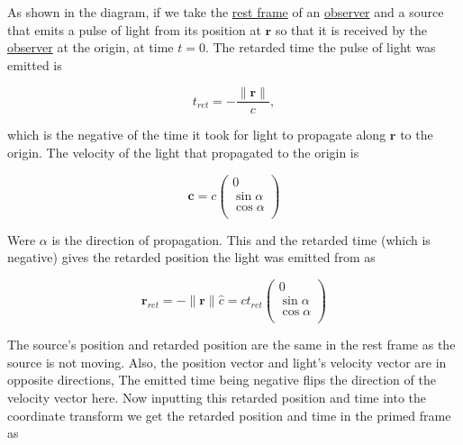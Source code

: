As shown in the diagram, if we take the \hyperlink{def-proper-frame}{rest frame} of an \hyperlink{def-observer}{observer} and a source that emits a pulse of light from its position at ${\mathbf{r}}$ so that it is received by the \hyperlink{def-observer}{observer} at the origin, at time ${t} = 0$.
The retarded time the pulse of light was emitted is

\begin{equation}
{{t}_{ret}} =-\frac{\|\mathbf{r}\|}{c},
\end{equation}

which is the negative of the time it took for light to propagate along ${\mathbf{r}}$ to the origin.
The velocity of the light that propagated to the origin is

\begin{equation}
	\mathbf{c} = {c}
	\begin{pmatrix}
		0            \\
		\sin{\alpha} \\
		\cos{\alpha} \\
	\end{pmatrix}
\end{equation}

Were ${\alpha}$ is the direction of propagation.
This and the retarded time (which is negative) gives the retarded position the light was emitted from as

\begin{equation}
	\mathbf{r}_{ret} = -\|\mathbf{r}\|\hat{c} ={c}{{{t}_{ret}}}
	\begin{pmatrix}
		0            \\
		\sin{\alpha} \\
		\cos{\alpha} \\
	\end{pmatrix}
\end{equation}

The source's position and retarded position are the same in the rest frame as the source is not moving.
Also, the position vector and light's velocity vector are in opposite directions, The emitted time being negative flips the direction of the velocity vector here.
Now inputting this retarded position and time into the coordinate transform we get the retarded position and time in the primed frame as

